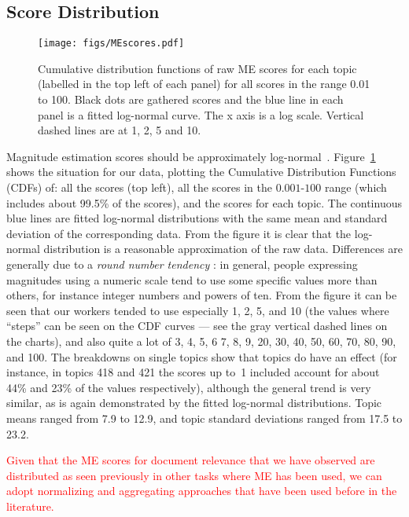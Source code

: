 \subsection{Score Distribution}
\label{sec:score-distribution}

\begin{figure}[t]
  \centering
  \texttt{[image: figs/MEscores.pdf]}
  \caption{Cumulative distribution functions of raw ME scores for each topic 
(labelled in the top left of each panel) for all scores in the range
0.01 to 100. Black dots are gathered scores and the blue line in each panel is a 
fitted log-normal curve. The x axis is a log scale. 
Vertical dashed lines are at 1, 2, 5 and 10.}
  \label{fig:ME-raw-scores}
\end{figure}

Magnitude estimation scores should be approximately
log-normal~\citep{Mar74,moskowitz:1977}. 
Figure~\ref{fig:ME-raw-scores} shows the situation for our data, 
plotting the Cumulative Distribution Functions (CDFs) of:
all the scores (top left), all the scores in the $0.001$-$100$ range
(which includes about 99.5\% of the scores), and the scores for each
topic. 
The continuous blue lines are fitted log-normal distributions with the
same mean and standard deviation of the corresponding data.  
From the figure it is clear that the log-normal distribution is a
reasonable approximation of the raw data. 
Differences are generally due to a \emph{round number tendency}
\cite{moskowitz:1977}: in general, people expressing magnitudes using
a numeric scale tend to use some specific values more than others, for
instance integer numbers and powers of ten. 
From the figure it can be seen that our workers tended to use
especially 1, 2, 5, and 10 (the values where ``steps'' can be seen on
the CDF curves --- see the gray vertical dashed lines on the charts),
and also quite a lot of 3, 4, 5, 6 7, 8, 9, 20, 30, 40, 50, 60, 70,
80, 90, and 100. 
The breakdowns on single topics show that topics do have an effect
(for instance, in topics 418 and 421 the scores up to~1 included
account for about 44\% and 23\% of the values respectively), although
the general trend is very similar, as is again demonstrated by the
fitted log-normal distributions.
Topic means ranged from 7.9 to 12.9, and topic standard deviations ranged
from 17.5 to 23.2.

\textcolor{red}{
Given that the ME scores for document relevance that we have observed are 
distributed as seen previously in other tasks where ME has been used, 
we can adopt normalizing and aggregating approaches that have been used before in
the literature.
}

